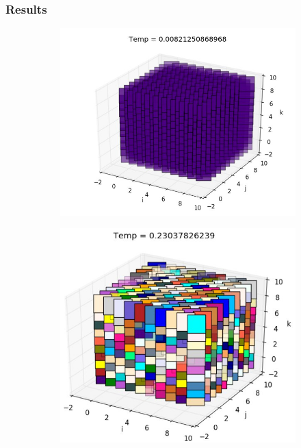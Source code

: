 \documentclass{beamer}
\begin{document}
\begin{frame}
\frametitle{Results}

\begin{figure}
\begin{subfigure}{0.45\textwidth}
  \centering
  \includegraphics[width=.8\linewidth]{fig/low_temp.jpg}
  \caption{}%
  \label{fig:low_tmp}
\end{subfigure}
\hspace*{\fill}
\begin{subfigure}{0.45\textwidth}
  \centering

  \includegraphics[width=.8\linewidth]{fig/high_tmp.jpg}
  \caption{}%
  \label{fig:high_temp}
\end{subfigure}


\end{figure}
\end{frame}
\end{document}
